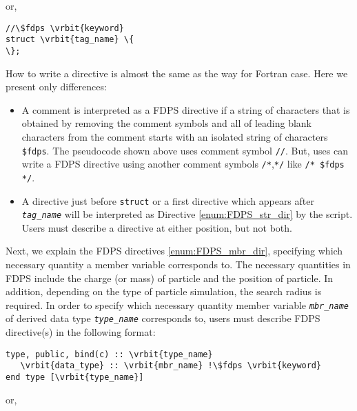 or,

\begin{screen}
\begin{Verbatim}[commandchars=\\\{\}]
//\$fdps \vrbit{keyword}
struct \vrbit{tag_name} \{
\};
\end{Verbatim}
\end{screen}

How to write a directive is almost the same as the way for Fortran case. Here we present only differences:
\begin{itemize}[leftmargin=*]
\item A comment is interpreted as a FDPS directive if a string of characters that is obtained by removing the comment symbols and all of leading blank characters from the comment starts with an isolated string of characters \verb|$fdps|. The pseudocode shown above uses comment symbol \texttt{//}. But, uses can write a FDPS directive using another comment symbols \texttt{/*},\texttt{*/} like \texttt{/* \$fdps */}.
\item A directive just before \texttt{struct} or a first directive which appears after \textit{\texttt{tag\_name}} will be interpreted as Directive \ref{enum:FDPS_str_dir} by the script. Users must describe a directive at either position, but not both.
\end{itemize}


Next, we explain the FDPS directives \ref{enum:FDPS_mbr_dir}, specifying which necessary quantity a member variable corresponds to. The necessary quantities in FDPS include the charge (or mass) of particle and the position of particle. In addition, depending on the type of particle simulation, the search radius is required. In order to specify which necessary quantity member variable \textit{\texttt{mbr\_name}} of derived data type \textit{\texttt{type\_name}} corresponds to, users must describe FDPS directive(s) in the following format:
\begin{screen}
\begin{Verbatim}[commandchars=\\\{\}]
type, public, bind(c) :: \vrbit{type_name}
   \vrbit{data_type} :: \vrbit{mbr_name} !\$fdps \vrbit{keyword}
end type [\vrbit{type_name}]
\end{Verbatim}
\end{screen}

or,

